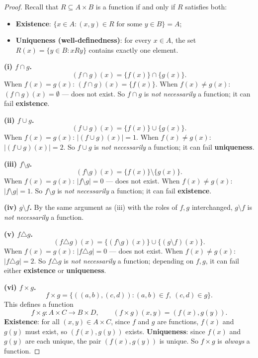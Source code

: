 \documentclass[11pt]{article}
\begin{document}
\begin{proof}
    Recall that $R\subseteq A\times B$ is a function if and only if
    $R$ satisfies both:
    \begin{itemize}
        \item \textbf{Existence}: $\{x\in A : (x,y)\in R \text{ for
            some } y\in B\} = A$;
        \item \textbf{Uniqueness (well-definedness)}: for every
            $x\in A$, the set $R(x)=\{y\in B : xRy\}$ contains
            exactly one element.
    \end{itemize}

    \medskip
    \textbf{(i) $f\cap g$.}
    \[
        (f\cap g)(x) = \{f(x)\}\cap\{g(x)\}.
    \]
    When $f(x)=g(x)$: $(f\cap g)(x) = \{f(x)\}$.
    When $f(x)\ne g(x)$: $(f\cap g)(x) = \emptyset$ --- does not
    exist. So $f\cap g$ is \emph{not necessarily} a function; it can
    fail \textbf{existence}.

    \medskip
    \textbf{(ii) $f\cup g$.} \label{5ii}
    \[
        (f\cup g)(x) = \{f(x)\}\cup\{g(x)\}.
    \]
    When $f(x)=g(x)$: $|(f\cup g)(x)|=1$.
    When $f(x)\ne g(x)$: $|(f\cup g)(x)|=2$. So $f\cup g$ is
    \emph{not necessarily} a function; it can fail
    \textbf{uniqueness}.

    \medskip
    \textbf{(iii) $f\setminus g$.}
    \[
        (f\setminus g)(x) = \{f(x)\}\setminus\{g(x)\}.
    \]
    When $f(x)=g(x)$: $|f\setminus g|=0$ --- does not exist.
    When $f(x)\ne g(x)$: $|f\setminus g|=1$. So $f\setminus g$ is
    \emph{not necessarily} a function; it can fail
    \textbf{existence}.

    \medskip
    \textbf{(iv) $g\setminus f$.}
    By the same argument as (iii) with the roles of $f,g$
    interchanged, $g\setminus f$ is \emph{not necessarily} a
    function.

    \medskip
    \textbf{(v) $f\triangle g$.}
    \[
        (f\triangle g)(x) = \{(f\setminus g)(x)\}
        \cup \{(g\setminus f)(x)\}.
    \]
    When $f(x)=g(x)$: $|f\triangle g|=0$ --- does not exist.
    When $f(x)\ne g(x)$: $|f\triangle g|=2$. So $f\triangle g$ is
    \emph{not necessarily} a function; depending on $f,g$, it can
    fail either \textbf{existence} or \textbf{uniqueness}.

    \medskip
    \textbf{(vi) $f\times g$.}
    \[
        f\times g = \{((a,b),(c,d)) : (a,b)\in f,\ (c,d)\in g\}.
    \]
    This defines a function
    \[
        f\times g : A\times C \to B\times D, \qquad
        (f\times g)(x,y) = (f(x), g(y)).
    \]
    \textbf{Existence}: for all $(x,y)\in A\times C$, since $f$ and
    $g$ are functions, $f(x)$ and $g(y)$ must exist, so
    $(f(x),g(y))$ exists.
    \textbf{Uniqueness}: since $f(x)$ and $g(y)$ are each unique,
    the pair $(f(x),g(y))$ is unique.
    So $f\times g$ is \emph{always} a function.
\end{proof}
\end{document}
